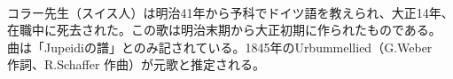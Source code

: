 \documentclass[10pt,b5j]{tarticle} %
\begin{document}
\begin{enumerate}
\begin{minipage}[c]{\blocksize}
        
    \end{minipage}
    \begin{minipage}[c]{\blocksize}
        
        \vspace{\linespace}
        \item~\\
        コラー先生（スイス人）は明治41年から予科でドイツ語を教えられ、大正14年、\\
        在職中に死去された。この歌は明治末期から大正初期に作られたものである。\\
        曲は「Jupeidiの譜」とのみ記されている。1845年のUrbummellied（G.Weber\\
        作詞、R.Schaffer 作曲）が元歌と推定される。
    
    \end{minipage}
\end{enumerate} %
\end{document}
